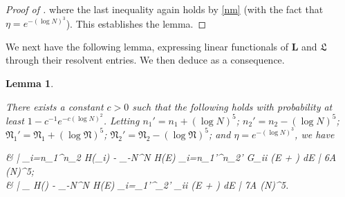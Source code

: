 \documentclass{amsart}
\numberwithin{equation}{section}
\DeclareMathOperator{\eig}{eig}
\DeclareMathOperator{\Imaginary}{Im}
\newtheorem{lem}[thm]{Lemma}
\theoremstyle{remark}
\theoremstyle{definition}
\begin{document}
\begin{proof}[Proof of ]
		\noindent where the last inequality again holds by \eqref{nm} (with the fact that $\eta = e^{-(\log N)^3}$). This establishes the lemma.
	\end{proof} 
	
	
	We next have the following lemma, expressing linear functionals of $\bm{L}$ and $\bm{\mathfrak{L}}$ through their resolvent entries. We then deduce  as a consequence.
	
	
	\begin{lem} 
		
		\label{estimatehlambdanu}
		
		There exists a constant $c>0$ such that the following holds with probability at least $1 - c^{-1} e^{-c(\log N)^2}$. Letting $n_1' = n_1 + (\log N)^5$; $n_2' = n_2 - (\log N)^5$; $\mathfrak{N}_1' = \mathfrak{N}_1 + (\log \mathfrak{N})^5$; $\mathfrak{N}_2' = \mathfrak{N}_2 - (\log \mathfrak{N})^5$; and $\eta = e^{-(\log N)^3}$, we have  
		\begin{flalign}
			\label{sumh}
			\begin{aligned}  
				& \Bigg| \displaystyle\sum_{i=n_1}^{n_2}  H(\Lambda_i) - \displaystyle{} \displaystyle\int_{-\log N}^{\log N} H(E) \displaystyle\sum_{i=n_1'}^{n_2'} \Imaginary G_{ii} (E +  \eta) dE \Bigg| \le 6A (\log N)^5; \\
				& \Bigg| \displaystyle{} \displaystyle\sum_{\nu \in \eig {}} H(\nu) - \displaystyle{} \displaystyle\int_{-\log N}^{\log N} H(E) \displaystyle\sum_{i=\mathfrak{N}_1'}^{_2'} \Imaginary {}_{ii} (E +  \eta) dE \Bigg| \le 7A (\log N)^5.
			\end{aligned} 
		\end{flalign}
	\end{lem} 
	
\end{document}
